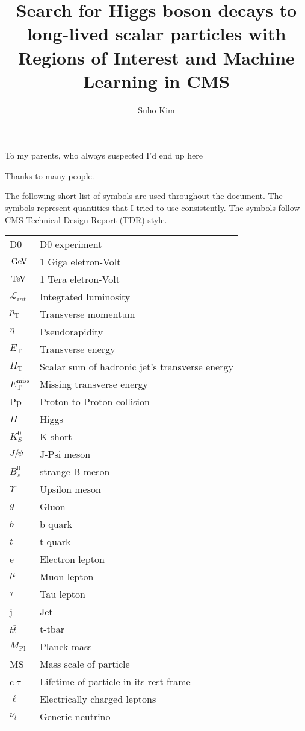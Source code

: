 \documentclass[11pt,expanded,copyright]{fsuthesis}
\title{Search for Higgs boson decays to long-lived scalar particles with Regions of Interest and Machine Learning in CMS}
\author{Suho Kim}  %
\newcommand {\DZERO}{D0\xspace}     %
\newcommand{\GeV}{\ensuremath{\,\text{Ge\hspace{-.08em}V}}\xspace}
\newcommand{\TeV}{\ensuremath{\,\text{Te\hspace{-.08em}V}}\xspace}
\newcommand{\Lumi}{\ensuremath{\mathcal{L}}\xspace}%
\newcommand{\Mpl}{\ensuremath{{M_\mathrm{Pl}}}\xspace}%
\newcommand{\pt}{\ensuremath{p_{\mathrm{T}}}\xspace}
\newcommand{\ET}{\ensuremath{E_{\mathrm{T}}}\xspace}
\newcommand{\HT}{\ensuremath{H_{\mathrm{T}}}\xspace}
\newcommand{\ETm}{\ensuremath{E_{\mathrm{T}}^{\text{miss}}}\xspace}
\newcommand{\MET}{\ETm}
\newcommand{\cmsSymbolFace}[1]{#1}
\providecommand{\PH}{\ensuremath{\cmsSymbolFace{H}}\xspace} %
\providecommand{\PJGy}{\ensuremath{\cmsSymbolFace{J}\hspace{-.08em}/\hspace{-.14em}\psi}\xspace} %
\providecommand{\PBzs}{\ensuremath{\cmsSymbolFace{B}^0_\cmsSymbolFace{s}}\xspace} %
\providecommand{\Pg}{\ensuremath{\cmsSymbolFace{g}}\xspace} %
\providecommand{\PGnl}{\ensuremath{\nu_\cmsSymbolFace{l}}\xspace} %
\providecommand{\PQt}{\ensuremath{\cmsSymbolFace{t}}\xspace} %
\providecommand{\PQb}{\ensuremath{\cmsSymbolFace{b}}\xspace} %
\providecommand{\PAQt}{\ensuremath{\bar{\cmsSymbolFace{t}}}\xspace} %
\providecommand{\PKzS}{\ensuremath{\cmsSymbolFace{K}^0_\cmsSymbolFace{S}}\xspace} %
\newcommand{\ttbar}{{\PQt{}\PAQt}\xspace} %
\begin{document}
\frontmatter          %
\maketitle            %
\makecommitteepage    %

\begin{dedication}
\centering
To my parents, who always suspected I'd end up here
\end{dedication}

\begin{acknowledgments}
Thanks to many people.
\end{acknowledgments}

\tableofcontents
\listoftables
\listoffigures
\begin{listofsymbols}
The following short list of symbols are used throughout the document.
The symbols represent quantities that I tried to use consistently.
The symbols follow CMS Technical Design Report (TDR) style.
\begin{center}
\begin{tabular}{ll}
\DZERO & D0 experiment \\
\GeV & 1 Giga eletron-Volt \\
\TeV & 1 Tera eletron-Volt \\
$\Lumi_{int}$ & Integrated luminosity\\
\pt & Transverse momentum \\
$\eta$ & Pseudorapidity \\
\ET & Transverse energy\\
\HT & Scalar sum of hadronic jet's transverse energy\\
\MET & Missing transverse energy\\
Pp & Proton-to-Proton collision\\
\PH & Higgs\\
$\PKzS$ & K short\\
\PJGy & J-Psi meson\\
$\PBzs$ & strange B meson\\
$\Upsilon$ & Upsilon meson\\
\Pg & Gluon\\
\PQb & b quark\\
\PQt & t quark\\
e & Electron lepton\\
$\mu$ & Muon lepton\\
$\tau$ & Tau lepton\\
j & Jet\\
\ttbar & t-tbar \\
\Mpl & Planck mass\\
MS & Mass scale of particle\\
c$\uptau$ & Lifetime of particle in its rest frame\\
$\ell$ & Electrically charged leptons\\
\PGnl & Generic neutrino\\
\end{tabular}
\end{center}
\end{listofsymbols}
\end{document}
